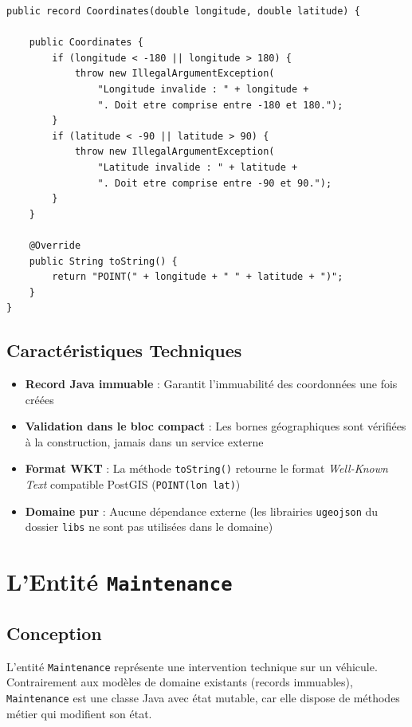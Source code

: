 \documentclass[12pt,a4paper]{report}
\begin{document}
\begin{lstlisting}[style=javaStyle, caption={Value Object Coordinates — domaine pur}]
public record Coordinates(double longitude, double latitude) {

    public Coordinates {
        if (longitude < -180 || longitude > 180) {
            throw new IllegalArgumentException(
                "Longitude invalide : " + longitude +
                ". Doit etre comprise entre -180 et 180.");
        }
        if (latitude < -90 || latitude > 90) {
            throw new IllegalArgumentException(
                "Latitude invalide : " + latitude +
                ". Doit etre comprise entre -90 et 90.");
        }
    }

    @Override
    public String toString() {
        return "POINT(" + longitude + " " + latitude + ")";
    }
}
\end{lstlisting}

\subsection{Caractéristiques Techniques}

\begin{itemize}[leftmargin=2cm]
  \item \textbf{Record Java immuable} : Garantit l'immuabilité des coordonnées une fois créées
  \item \textbf{Validation dans le bloc compact} : Les bornes géographiques sont vérifiées à la construction, jamais dans un service externe
  \item \textbf{Format WKT} : La méthode \texttt{toString()} retourne le format \textit{Well-Known Text} compatible PostGIS (\texttt{POINT(lon lat)})
  \item \textbf{Domaine pur} : Aucune dépendance externe (les librairies \texttt{ugeojson} du dossier \texttt{libs} ne sont pas utilisées dans le domaine)
\end{itemize}

\section{L'Entité \texttt{Maintenance}}

\subsection{Conception}

L'entité \texttt{Maintenance} représente une intervention technique sur un véhicule. Contrairement aux modèles de domaine existants (records immuables), \texttt{Maintenance} est une classe Java avec état mutable, car elle dispose de méthodes métier qui modifient son état.
\end{document}
